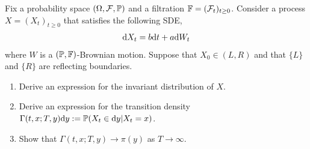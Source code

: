\begin{problem}
Fix a probability space \( (\Omega, \mathcal{F},\mathbb{P}) \) and a filtration \( \mathbb{F} = (\mathcal{F}_t)_{t\geq 0} \). Consider a process \( X = (X_t)_{t\geq 0} \) that satisfies the following SDE,
\begin{align*}
    \mathrm{d} X_t = b\mathrm{d} t + a\mathrm{d} W_t
\end{align*}
where \( W \) is a \( (\mathbb{P},\mathbb{F}) \)-Brownian motion. Suppose that \( X_0 \in (L,R) \) and that \( \{L\} \) and \( \{R\} \) are reflecting boundaries.
\begin{enumerate}[nolistsep,label=(\alph*)]
    \item Derive an expression for the invariant distribution of \( X \).
    \item Derive an expression for the transition density \( \Gamma(t,x;T,y)\mathrm{d} y:= \mathbb{P}(X_t \in\mathrm{d} y | X_t = x) \).
    \item Show that \( \Gamma(t,x;T,y) \to \pi(y) \) as \( T\to\infty \).
\end{enumerate}
\end{problem}

